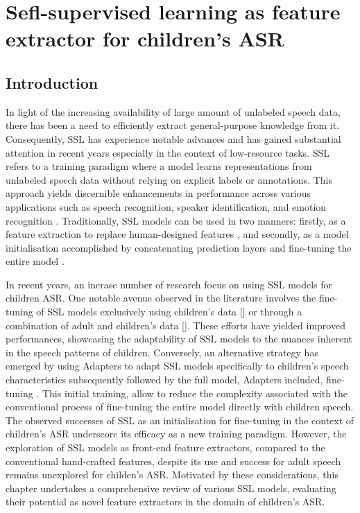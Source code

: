\chapter{Sefl-supervised learning as feature extractor for children's ASR}
\label{chapter:appendixB}

\section{Introduction}
In light of the increasing availability of large amount of unlabeled speech data, there has been a need to efficiently extract general-purpose knowledge from it. Consequently, SSL has experience notable advances and has gained substantial attention in recent years especially in the context of low-resource tasks. SSL refers to a training paradigm where a model learns representations from unlabeled speech data without relying on explicit labels or annotations. This approach yields discernible enhancements in performance across various applications such as speech recognition, speaker identification, and emotion recognition \cite{baevski2020wav2vec}. Traditionally, SSL models can be used in two manners: firstly, as a feature extraction to replace human-designed features \cite{yang21c_interspeech,chang2021exploration}, and secondly, as a model initialisation accomplished by concatenating prediction layers and fine-tuning the entire model \cite{fan2022draft,jain2023wav2vec2,wang2021fine,li2021accent}.

In recent years, an incrase number of research focus on using SSL models for children ASR. One notable avenue observed in the literature involves the fine-tuning of SSL models exclusively using children's data [] or through a combination of adult and children's data []. These efforts have yielded improved performances, showcasing the adaptability of SSL models to the nuances inherent in the speech patterns of children. Conversely, an alternative strategy has emerged by using Adapters to adapt SSL models specifically to children's speech characteristics subsequently followed by the full model, Adapters included, fine-tuning \cite{fan2022draft}. This initial training, allow to reduce the complexity associated with the conventional process of fine-tuning the entire model directly with children speech.
The observed successes of SSL as an initialisation for fine-tuning in the context of children's ASR underscore its efficacy as a new training paradigm. However, the exploration of SSL models as front-end feature extractors, compared to the conventional hand-crafted features, despite its use and success for adult speech \cite{yang21c_interspeech,chang2021exploration} remains unexplored for childen's ASR. Motivated by these considerations, this chapter undertakes a comprehensive review of various SSL models, evaluating their potential as novel feature extractors in the domain of children's ASR.

